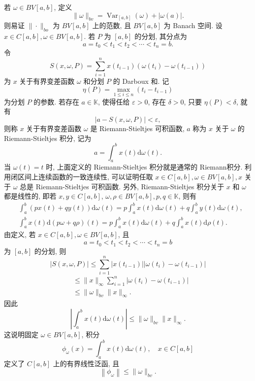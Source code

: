 \documentclass[openany]{ctexbook}
\theoremstyle{kaiti}
\theoremstyle{normal}
\begin{document}
若 $\omega \in BV[a, b]$, 定义
$$
\|\omega\|_{b v}=\operatorname{Var}_{[a, b]}(\omega)+|\omega(a)|.
$$
则易证 $\|\cdot\|_{b o}$ 为 $B V[a, b]$ 上的范数, 且 $B V[a, b]$ 为 Banach 空间. 设 $x \in C[a, b], \omega \in B V[a, b]$. 若 $P$ 为 $[a, b]$ 的分划, 其分点为
$$
a=t_0<t_1<t_2<\cdots<t_n=b.
$$
令
$$
S(x, \omega, P)=\sum_{i=1}^n x\left(t_{i-1}\right)\left(\omega\left(t_{i}\right)-\omega\left(t_{i-1}\right)\right)
$$
为 $x$ 关于有界变差函数 $\omega$ 和分划 $P$ 的 Darboux 和. 记
$$
\eta(P)=\max_{1 \leqslant i \leqslant n}\left(t_{i}-t_{i-1}\right)
$$
为分划 $P$ 的参数. 若存在 $a \in \mathbb{K}$, 使得任给 $\varepsilon>0$, 存在 $\delta>0$, 只要 $\eta(P)<\delta$, 就有
$$
|a-S(x, \omega, P)|<\varepsilon,
$$
则称 $x$ 关于有界变差函数 $\omega$ 是 Riemann-Stieltjes 可积函数, $a$ 称为 $x$ 关于 $\omega$ 的 Riemann-Stieltjes 积分, 记为
$$
a=\int_{a}^{b} x(t) \mathrm{d} \omega(t).
$$
当 $\omega(t)=t$ 时, 上面定义的 Riemann-Stieltjes 积分就是通常的 Riemann积分. 利用闭区间上连续函数的一致连续性, 可以证明任取 $x \in C[a, b], \omega \in B V[a, b], x$ 关于 $\omega$ 总是 Riemann-Stieltjes 可积函数. 另外, Riemann-Stieltjes 积分关于 $x$ 和 $\omega$ 都是线性的, 即若 $x, y \in C[a, b]$, $\omega, \rho \in B V[a, b], p, q \in \mathbb{K}$, 则有
$$
\begin{aligned}
&\int_{a}^{b}(p x(t)+q y(t)) \mathrm{d} \omega(t)=p \int_{a}^{b} x(t) \mathrm{d} \omega(t)+q \int_{a}^{b} y(t) \mathrm{d} \omega(t), \\
&\int_{a}^{b} x(t) \mathrm{d}(p \omega+q \rho)(t)=p \int_{a}^{b} x(t) \mathrm{d} \omega(t)+q \int_{a}^{b} x(t) \mathrm{d} \rho(t).
\end{aligned}
$$
由定义, 若 $x \in C[a, b], \omega \in B V[a, b]$, 且
$$
a=t_0<t_1<t_2<\cdots<t_n=b
$$
为 $[a, b]$ 的分划, 则
$$
|S(x, \omega, P)| \leqslant \sum_{i=1}^n\left|x\left(t_{i-1}\right)\right|\left|\omega\left(t_{i}\right)-\omega\left(t_{i-1}\right)\right|
$$
$$
\begin{aligned}
&\leqslant\|x\|_{\infty} \sum_{i=1}^n\left|\omega\left(t_{i}\right)-\omega\left(t_{i-1}\right)\right| \\
&\leqslant\|\omega\|_{b v}\|x\|_{\infty}.
\end{aligned}
$$
因此
$$
\left|\int_{a}^{b} x(t) \mathrm{d} \omega(t)\right| \leqslant\|\omega\|_{b v}\|x\|_{\infty}.
$$
这说明固定 $\omega \in B V[a, b]$, 积分
$$
\phi_{\omega}(x)=\int_{a}^{b} x(t) \mathrm{d} \omega(t), \quad x \in C[a, b]
$$
定义了 $C[a, b]$ 上的有界线性泛函, 且
\begin{equation}
  \left\|\phi_{\omega}\right\| \leqslant\|\omega\|_{bv}.
\end{equation}
\end{document}
